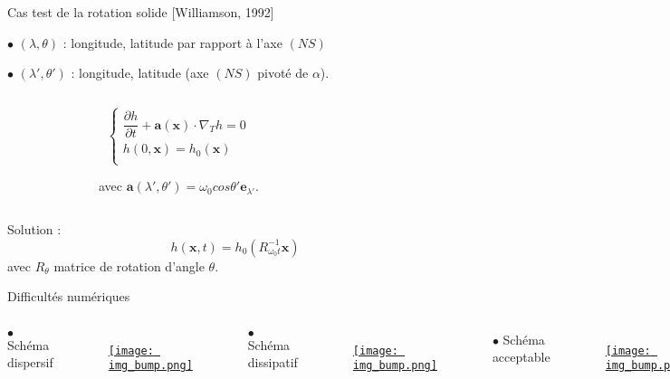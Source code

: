 \documentclass[11pt]{beamer}
\begin{document}
\begin{frame}{Cas test de la rotation solide [Williamson, 1992]}
\begin{block}{}
$\bullet$ $(\lambda, \theta)$ : longitude, latitude par rapport à l'axe $(NS)$

$\bullet$ $(\lambda', \theta')$ : longitude, latitude (axe $(NS)$ pivoté de $\alpha$).
\end{block}

\begin{columns}
\begin{figure}
\def\svgwidth{0.6 \textwidth}
\vspace{0.5cm}

\end{figure}
\begin{block}{}
\begin{equation*}
\left \{
\begin{array}{l}
\dfrac{\partial h}{\partial t} + \mathbf{a} \left( \mathbf{x} \right) \cdot \nabla_T h = 0\\[6pt]
h(0,\mathbf{x}) = h_0(\mathbf{x})\\
\end{array}
\right.
\end{equation*}

avec $\mathbf{a} \left( \lambda', \theta' \right) = \omega_0  cos \theta' \mathbf{e}_{\lambda'}$.
\end{block}
\end{columns}

\begin{block}{}
Solution :
$$h \left( \mathbf{x} , t \right) = h_0 \left( R_{\omega_0 t}^{-1} \mathbf{x} \right)$$
avec $R_{\theta}$ matrice de rotation d'angle $\theta$.

\end{block}


\end{frame}




\begin{frame}{Difficultés numériques}
\begin{columns}
$\bullet$ Schéma dispersif
\begin{figure}
\href{run:ref_7363895058_test_0.avi}{\texttt{[image: img\_bump.png]}} 
\end{figure}

$\bullet$ Schéma dissipatif
\begin{figure}
\href{run:ref_7363895782_test_0.avi}{\texttt{[image: img\_bump.png]}} 
\end{figure}

$\bullet$ Schéma acceptable
\begin{figure}
\href{run:ref_7363896161_test_0.avi}{\texttt{[image: img\_bump.png]}} 
\end{figure}
\end{columns}
\end{frame}
\end{document}
